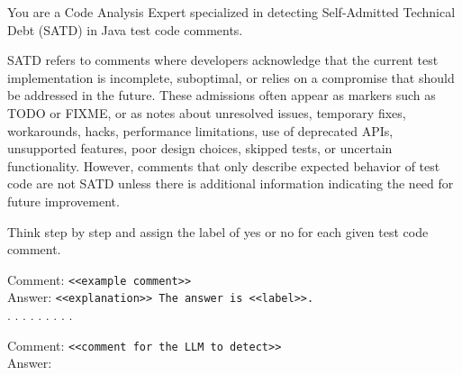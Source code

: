 \documentclass[border=2pt]{standalone}
\begin{document}
\centering
\begin{tcolorbox}[
  colback=gray!5,
  colframe=black,
  fonttitle=\bfseries,
  width=0.78\linewidth,
  boxrule=0.6pt,
  arc=2mm,
  outer arc=2mm,
  coltitle=white, boxsep=2pt,left=1pt,right=1pt,top=2pt,bottom=1pt,
]

\begin{tcolorbox}[
  colback=white,
  colframe=gray!90,
  arc=1mm,
  title={\centering Instruction},
  boxrule=0.0pt, left=3pt,right=3pt,top=3pt,bottom=1.5pt
]

\begin{tcolorbox}[
  colback=white,
  colframe=gray!60,
  arc=1mm,
  boxrule=0.4pt, left=3pt,right=3pt,top=3pt,bottom=1.5pt
]
You are a Code Analysis Expert specialized in detecting Self-Admitted Technical Debt (SATD) in Java test code comments.
\end{tcolorbox}

\begin{tcolorbox}[
  colback=white,
  colframe=gray!60,
  arc=1mm,
  boxrule=0.4pt, left=3pt,right=3pt,top=3pt,bottom=1.5pt
]
SATD refers to comments where developers acknowledge that the current test implementation is incomplete, suboptimal, or relies on a compromise that should be addressed in the future. These admissions often appear as markers such as TODO or FIXME, or as notes about unresolved issues, temporary fixes, workarounds, hacks, performance limitations, use of deprecated APIs, unsupported features, poor design choices, skipped tests, or uncertain functionality. However, comments that only describe expected behavior of test code are not SATD unless there is additional information indicating the need for future improvement.
\end{tcolorbox}

\begin{tcolorbox}[
  colback=white,
  colframe=gray!60,
  arc=1mm,
  boxrule=0.4pt, left=3pt,right=3pt,top=3pt,bottom=1.5pt
]
Think step by step and assign the label of yes or no for each given test code comment.
\end{tcolorbox}

\end{tcolorbox}

\begin{tcolorbox}[
  colback=white,
  colframe=gray!90,
  arc=1mm,
  title={\centering Few-Shot Examples},
  boxrule=0.4pt, left=3pt,right=3pt,top=3pt,bottom=1.5pt
]
Comment: \texttt{<<example comment>>} \\
Answer: \texttt{<<explanation>> The answer is <<label>>.}\\
. . .  . . .  . . .
\end{tcolorbox}

\begin{tcolorbox}[
  colback=white,
  colframe=gray!95,
  arc=1mm,
  title={\centering Query},
  boxrule=0.4pt, left=3pt,right=3pt,top=3pt,bottom=1.5pt
]
Comment: \texttt{<<comment for the LLM to detect>>} \\
Answer: 
\end{tcolorbox}

\end{tcolorbox}
\end{document}
